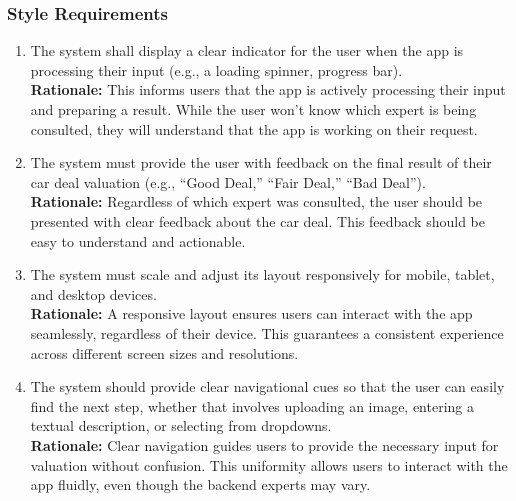 \documentclass[]{article}
\begin{document}
\subsubsection{Style Requirements}
\label{ssub:style_requirements}
\begin{enumerate}[{LF-S}1.]
    \item The system shall display a clear indicator for the user when the app is processing their input (e.g., a loading spinner, progress bar). \\
    \textbf{Rationale:} This informs users that the app is actively processing their input and preparing a result. While the user won't know which expert is being consulted, they will understand that the app is working on their request.
    
    \item The system must provide the user with feedback on the final result of their car deal valuation (e.g., “Good Deal,” “Fair Deal,” “Bad Deal”).  \\
    \textbf{Rationale:} Regardless of which expert was consulted, the user should be presented with clear feedback about the car deal. This feedback should be easy to understand and actionable.

    \item  The system must scale and adjust its layout responsively for mobile, tablet, and desktop devices.  \\
    \textbf{Rationale:} A responsive layout ensures users can interact with the app seamlessly, regardless of their device. This guarantees a consistent experience across different screen sizes and resolutions.

    \item The system should provide clear navigational cues so that the user can easily find the next step, whether that involves uploading an image, entering a textual description, or selecting from dropdowns.  \\
    \textbf{Rationale:} Clear navigation guides users to provide the necessary input for valuation without confusion. This uniformity allows users to interact with the app fluidly, even though the backend experts may vary.
\end{enumerate}
\end{document}
